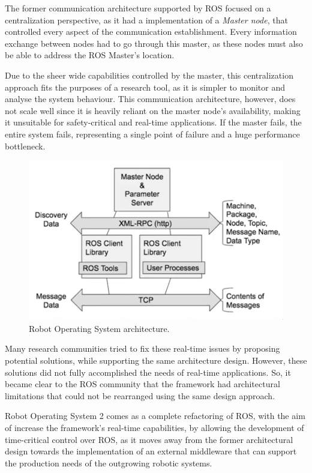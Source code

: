 The former communication architecture supported by ROS focused on a centralization perspective, as it had a implementation of a \textit{Master node}, that controlled every aspect of the communication establishment. Every information exchange between nodes had to go through this master, as these nodes must also be able to address the ROS Master's location.

Due to the sheer wide capabilities controlled by the master, this centralization approach fits the purposes of a research tool, as it is simpler to monitor and analyse the system behaviour. This communication architecture, however, does not scale well since it is heavily reliant on the master node's availability, making it unsuitable for safety-critical and real-time applications. If the master fails, the entire system fails, representing a single point of failure and a huge performance bottleneck.

\begin{figure}[H]
  \centering
  \includegraphics[width=0.5\linewidth]{images/former-ros1-architecture.png}
  \caption{Robot Operating System architecture.}
  \label{fig:ros1-architecture}
\end{figure}

Many research communities tried to fix these real-time issues by proposing potential solutions, while supporting the same architecture design. However, these solutions did not fully accomplished the needs of real-time applications. So, it became clear to the ROS community that the framework had architectural limitations that could not be rearranged using the same design approach. \cite{maruyama2016exploring}

Robot Operating System 2 comes as a complete refactoring of ROS, with the aim of increase the framework's real-time capabilities, by allowing the development of time-critical control over ROS, as it moves away from the former architectural design towards the implementation of an external middleware that can support the production needs of the outgrowing robotic systems. \cite{kim2018security, casini2019response}

